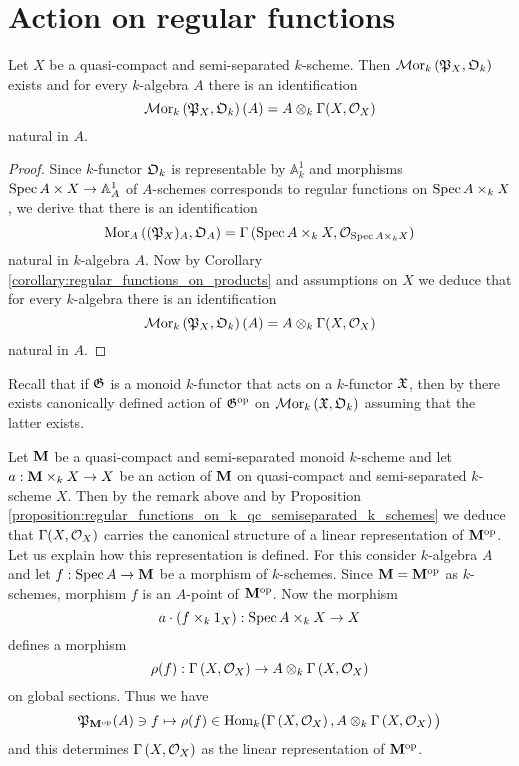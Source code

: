 \section{Action on regular functions}

\begin{proposition}\label{proposition:regular_functions_on_k_qc_semiseparated_k_schemes}
Let $X$ be a quasi-compact and semi-separated $k$-scheme. Then $\mathcal{M}\mathrm{or}_k\left({\mathfrak P}_X,{\mathfrak O}_k\right)$ exists and for every $k$-algebra $A$ there is an identification
$$\mathcal{M}\mathrm{or}_k\left({\mathfrak P}_X,{\mathfrak O}_k\right)(A) =  A\otimes_k\Gamma(X,{\mathcal O}_X)$$
natural in $A$.
\end{proposition}
\begin{proof}
Since $k$-functor ${\mathfrak O}_k$ is representable by $\mathbb{A}^1_k$ {\cite[Fact 3.2]{Monoid_k_functors}} and morphisms $\mathrm{Spec}\, A\times X\rightarrow \mathbb{A}^1_A$ of $A$-schemes corresponds to regular functions on $\mathrm{Spec}\, A \times_k X$, we derive that there is an identification
$$\mathrm{Mor}_A\left(({\mathfrak P}_X)_A,{\mathfrak O}_A\right) = \Gamma\left(\mathrm{Spec}\, A\times_k X,{\mathcal O}_{\mathrm{Spec}\, A\times_k X}\right)$$
natural in $k$-algebra $A$. Now by Corollary \ref{corollary:regular_functions_on_products} and assumptions on $X$ we deduce that for every $k$-algebra there is an identification
$$\mathcal{M}\mathrm{or}_k\left({\mathfrak P}_X,{\mathfrak O}_k\right)(A) =  A\otimes_k\Gamma(X,{\mathcal O}_X)$$
natural in $A$.
\end{proof}
\noindent
Recall that if ${\mathfrak G}$ is a monoid $k$-functor that acts on a $k$-functor ${\mathfrak X}$, then by {\cite[Proposition 10.2]{Monoid_k_functors}} there exists canonically defined action of ${\mathfrak G}^{\mathrm{op}}$ on $\mathcal{M}\mathrm{or}_k\left({\mathfrak X},{\mathfrak O}_k\right)$ assuming that the latter exists.

\begin{example}\label{example:k_monoid_action_on_regular_functions}
Let $\mathbf{M}$ be a quasi-compact and semi-separated monoid $k$-scheme and let $a:\mathbf{M}\times_kX\rightarrow X$ be an action of $\mathbf{M}$ on quasi-compact and semi-separated $k$-scheme $X$. Then by the remark above and by Proposition \ref{proposition:regular_functions_on_k_qc_semiseparated_k_schemes} we deduce that $\Gamma(X,{\mathcal O}_X)$ carries the canonical structure of a linear representation of $\mathbf{M}^{\mathrm{op}}$. Let us explain how this representation is defined. For this consider $k$-algebra $A$ and let $f:\mathrm{Spec}\, A\rightarrow \mathbf{M}$ be a morphism of $k$-schemes. Since $\mathbf{M} = \mathbf{M}^{\mathrm{op}}$ as $k$-schemes, morphism $f$ is an $A$-point of $\mathbf{M}^{\mathrm{op}}$. Now the morphism
$$a\cdot \left(f\times_k 1_X\right):\mathrm{Spec}\, A\times_k X\rightarrow X$$
defines a morphism
$$\rho(f):\Gamma\left(X,{\mathcal O}_X\right)\rightarrow A\otimes_k \Gamma\left(X,{\mathcal O}_X\right)$$
on global sections. Thus we have
$${\mathfrak P}_{\mathbf{M}^{\mathrm{op}}}(A)\ni f\mapsto \rho(f) \in \mathrm{Hom}_k\big(\Gamma\left(X,{\mathcal O}_X\right), A\otimes_k \Gamma\left(X,{\mathcal O}_X\right)\big)$$
and this determines $\Gamma\left(X,{\mathcal O}_X\right)$ as the linear representation of $\mathbf{M}^{\mathrm{op}}$.
\end{example}

